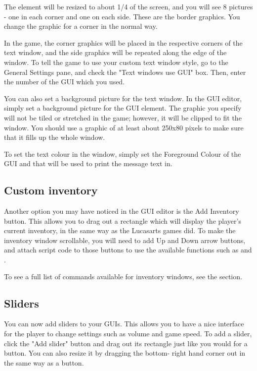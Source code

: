The element will be resized to about 1/4 of the screen, and you will see 8
pictures - one in each corner and one on each side. These are the border
graphics. You change the graphic for a corner in the normal way.

In the game, the corner graphics will be placed in the respective corners of
the text window, and the side graphics will be repeated along the edge of
the window. To tell the game to use your custom text window style, go to the
General Settings pane, and check the "Text windows use GUI" box. Then, enter
the number of the GUI which you used.

You can also set a background picture for the text window. In the GUI editor,
simply set a background picture for the GUI element. The graphic you specify
will not be tiled or stretched in the game; however, it will be clipped to
fit the window. You should use a graphic of at least about 250x80 pixels to
make sure that it fills up the whole window.

To set the text colour in the window, simply set the Foreground Colour of
the GUI and that will be used to print the message text in.

\subsection{Custom inventory}%

Another option you may have noticed in the GUI editor is the Add Inventory
button. This allows you to drag out a rectangle which will display the
player's current inventory, in the same way as the Lucasarts games did. To
make the inventory window scrollable, you will need to add Up and Down arrow
buttons, and attach script code to those buttons to use the available
functions such as  and
.

To see a full list of commands available for inventory windows, see
the  section.

\subsection{Sliders}%

You can now add sliders to your GUIs. This allows you to have a nice interface
for the player to change settings such as volume and game speed.
To add a slider, click the "Add slider" button and drag out its rectangle just
like you would for a button. You can also resize it by dragging the bottom-
right hand corner out in the same way as a button.

